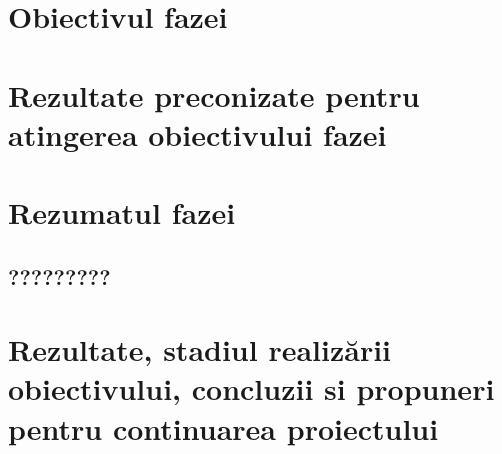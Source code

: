 \documentclass[a4paper, 10pt]{article}
\begin{document}
{\section{Obiectivul fazei}






\section{Rezultate preconizate pentru atingerea obiectivului fazei}


\begin{comment}
 
Urmatoarele sisteme ale aplicatiei au fost realizate:
\begin{itemize}
\item
Modul de administrare
\item
Modul de acces la date
\item
Motor statistic
\end{itemize}

\end{comment}


\section{Rezumatul fazei}

\medskip

\subsection{?????????}



\clearpage

\section{Rezultate, stadiul realiz\u{a}rii obiectivului, concluzii si propuneri pentru continuarea proiectului}



}
\end{document}
